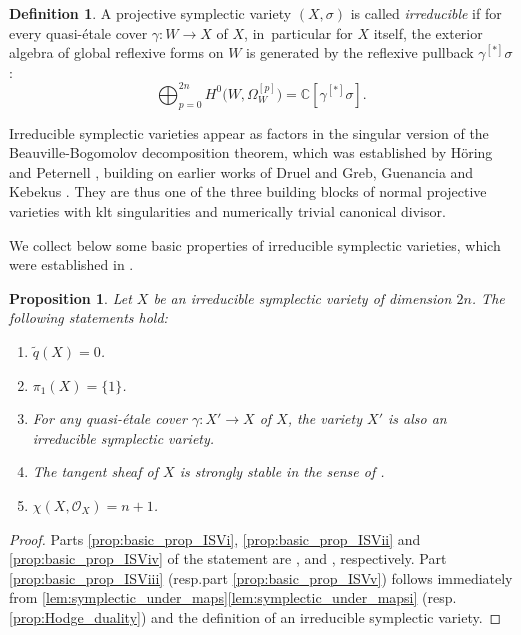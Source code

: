 \documentclass[10pt]{amsart}
\newcommand{\resp}{resp.}
\theoremstyle{plain}
\newtheorem{prop}[thm]{Proposition}
\theoremstyle{definition}
\newtheorem{dfn}[thm]{Definition}
\newcommand{\C}{\mathbb{C}}
\newcommand{\OO}{\mathcal{O}}
\begin{document}
\begin{dfn}
\label{dfn:IS_variety}
A projective symplectic variety $(X,\sigma)$ is called \emph{irreducible} if for every quasi-étale cover $\gamma \colon W \to X$ of $X$, in~particular for $X$ itself, the exterior algebra of global reflexive forms on $W$ is generated by the reflexive pullback $\gamma^{[*]} \sigma$:
\[
\bigoplus_{p=0}^{2n} H^0 \bigl(W, \Omega_W^{[p]} \bigr) = \C [\gamma^{[*]} \sigma].
\]
\end{dfn}

Irreducible symplectic varieties appear as factors in the singular version of the Beauville-Bogo\-molov decomposition theorem, which was established by Höring and Peternell \cite{HoerPet19}, building on earlier works of Druel \cite{Druel18} and Greb, Guenancia and Kebekus \cite{GGK19}. They are thus one of the three building blocks of normal projective varieties with klt singularities and numerically trivial canonical divisor.

We collect below some basic properties of irreducible symplectic varieties, which were established in \cite{GKP16b,GGK19}.

\begin{prop}
\label{prop:basic_prop_ISV}
Let $X$ be an irreducible symplectic variety of dimension $2n$. The following statements hold:
\begin{enumerate}
\item\label{prop:basic_prop_ISVi}
$\widetilde{q}(X)=0$.

\item\label{prop:basic_prop_ISVii}
$\pi_1(X) = \{ 1 \}$.

\item\label{prop:basic_prop_ISViii}
For any quasi-étale cover $\gamma \colon X'\to X$ of $X$, the variety $X'$ is also an irreducible symplectic variety.

\item\label{prop:basic_prop_ISViv}
The tangent sheaf of $X$ is strongly stable in the sense of \cite[Def.\,7.2]{GKP16b}.

\item\label{prop:basic_prop_ISVv}
$\chi(X, \OO_X) = n+1$.
\end{enumerate}
\end{prop}

\begin{proof}
Parts \eqref{prop:basic_prop_ISVi}, \eqref{prop:basic_prop_ISVii} and \eqref{prop:basic_prop_ISViv} of the statement are \cite[Rem.\,8.17]{GKP16b}, \cite[Cor.\,13.3]{GGK19} and \cite[Prop.\,8.20]{GKP16b}, respectively. Part \eqref{prop:basic_prop_ISViii} (\resp part \eqref{prop:basic_prop_ISVv}) follows immediately from \autoref{lem:symplectic_under_maps}\eqref{lem:symplectic_under_mapsi} (\resp \autoref{prop:Hodge_duality}) and the definition of an irreducible symplectic variety.
\end{proof}
\end{document}
